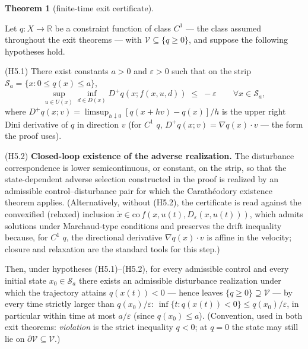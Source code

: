 \documentclass[11pt]{article}
\theoremstyle{definition}
\newtheorem{theorem}{Theorem}
\begin{document}
\begin{theorem}[finite-time exit certificate]\label{thm:exit}

Let \(q : X \to \mathbb{R}\) be a constraint function of class \(C^1\) --- the class assumed throughout the exit theorems --- with
\(\mathcal{V} \subseteq \{ q \ge 0 \}\), and suppose the following
hypotheses hold.

(H5.1) There exist constants \(a > 0\) and \(\varepsilon > 0\) such that
on the strip \(\mathcal{S}_a = \{ x : 0 \le q(x) \le a \}\),
\[\sup_{u \in U(x)} \inf_{d \in D(x)} D^+ q(x; f(x,u,d)) \;\le\; -\varepsilon \qquad \forall x \in \mathcal{S}_a, \tag{4}\]
where \(D^+ q(x; v) = \limsup_{h \downarrow 0} [q(x + hv) - q(x)]/h\) is
the upper right Dini derivative of \(q\) in direction \(v\) (for \(C^1\)
\(q\), \(D^+ q(x; v) = \nabla q(x) \cdot v\) --- the form the proof
uses).

(H5.2) \textbf{Closed-loop existence of the adverse realization.} The
disturbance correspondence is lower semicontinuous, or constant, on the
strip, so that the state-dependent adverse selection constructed in the
proof is realized by an admissible control--disturbance pair for which
the Carath\'eodory existence theorem applies. (Alternatively, without (H5.2), the certificate is read against the convexified (relaxed) inclusion
\(\dot x \in \mathrm{co}\, f(x, u(t), D_{\varepsilon}(x, u(t)))\), which
admits solutions under Marchaud-type conditions and preserves the drift
inequality because, for \(C^1\) \(q\), the directional derivative
\(\nabla q(x)\cdot v\) is affine in the velocity; closure and
relaxation are the standard tools for this step.)

Then, under hypotheses (H5.1)--(H5.2), for every
admissible control and every initial state \(x_0 \in \mathcal{S}_a\)
there exists an admissible disturbance realization under which the
trajectory attains \(q(x(t)) < 0\) --- hence leaves
\(\{ q \ge 0 \} \supseteq \mathcal{V}\) --- by every time strictly
larger than \(q(x_0)/\varepsilon\):
\(\inf\{ t : q(x(t)) < 0 \} \le q(x_0)/\varepsilon\), in particular
within time at most \(a/\varepsilon\) (since \(q(x_0) \le a\)).
(Convention, used in both exit theorems: \emph{violation} is the strict
inequality \(q < 0\); at \(q = 0\) the state may still lie on
\(\partial \mathcal{V} \subseteq \mathcal{V}\).)

\end{theorem}
\end{document}
